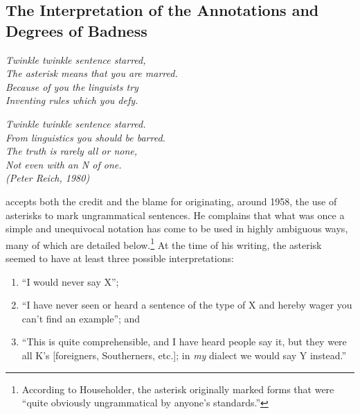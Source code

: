 \subsection{The Interpretation of the Annotations and Degrees of Badness}\label{sec:2.3.4}
\begin{flushright}
\itshape
Twinkle twinkle sentence starred,\\
The asterisk means that you are marred. \\
Because of you the linguists try \\
Inventing rules which you defy.\\
\end{flushright}
\begin{flushright}
\noindent\itshape Twinkle twinkle sentence starred.\\
From linguistics you should be barred.\\
The truth is rarely all or none,\\
Not even with an N of one.\\

\noindent\upshape (Peter Reich, 1980)\\
\end{flushright}

\citet{Householder1973} accepts both the credit and the blame for originating, around 1958, the use of asterisks to mark ungrammatical sentences.  He complains that what was once a simple and unequivocal notation has come to be used in highly ambiguous ways, many of which are detailed below.\footnote{According to Householder, the asterisk originally marked forms that were ``quite obviously ungrammatical by anyone's standards.''}
 At the time of his writing, the asterisk seemed to have at least three possible interpretations:

\begin{enumerate}
\item ``I would never say X'';

\item ``I have never seen or heard a sentence of the type of X and hereby wager you can't find an example''; and

\item ``This is quite comprehensible, and I have heard people say it, but they were all K's [foreigners, Southerners, etc.]; in \textit{my} dialect we would say Y instead.'' \citep[370\textendash{}372]{Householder1973}

\end{enumerate}


